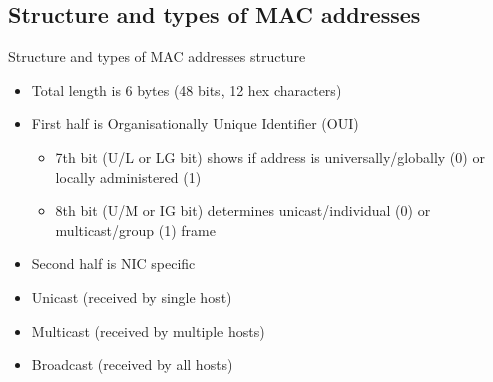 \subsection{Structure and types of MAC addresses}
\begin{frame}{Structure and types of MAC addresses}
	 structure\pause
	\begin{itemize}[<+->]
		\item Total length is 6 bytes (48 bits, 12 hex characters)
		\item First half is Organisationally Unique Identifier (OUI)
		\begin{itemize}
			\item 7th bit (U/L or LG bit) shows if address is universally/globally (0) or locally administered (1)
			\item 8th bit (U/M or IG bit) determines unicast/individual (0) or multicast/group (1) frame
		\end{itemize}
		\item Second half is NIC specific
	\end{itemize}
	\pause
	\begin{itemize}[<+->]
		\item Unicast (received by single host)
		\item Multicast (received by multiple hosts)
		\item Broadcast (received by all hosts)
	\end{itemize}
\end{frame}

